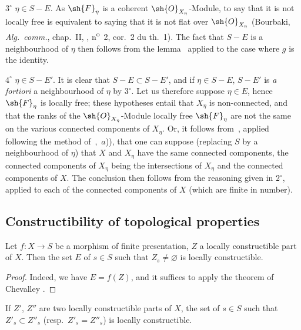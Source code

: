 $3^\circ$ $\eta\in S-E$.
As $\sh{F}_\eta$ is a coherent $\sh{O}_{X_\eta}$-Module, to say that it is not locally free is equivalent to saying that it is not flat over $\sh{O}_{X_\eta}$ (Bourbaki, \emph{Alg.\ comm.}, chap.~II, , n\textsuperscript{o}~2, cor.~2 du th.~1).
The fact that $S-E$ is a neighbourhood of $\eta$ then follows from the lemma~ applied to the case where $g$ is the identity.

$4^\circ$ $\eta\in S-E'$.
It is clear that $S-E\subset S-E'$, and if $\eta\in S-E$, $S-E'$ is \emph{a fortiori} a neighbourhood of $\eta$ by $3^\circ$.
Let us therefore suppose $\eta\in E$, hence $\sh{F}_\eta$ is locally free; these hypotheses entail that $X_\eta$ is non-connected, and that the ranks of the $\sh{O}_{X_\eta}$-Module locally free $\sh{F}_\eta$ are not the same on the various connected components of $X_\eta$.
Or, it follows from~, applied following the method of~,~$a$)), that one can suppose (replacing $S$ by a neighbourhood of $\eta$) that $X$ and $X_\eta$ have the same connected components, the connected components of $X_\eta$ being the intersections of $X_\eta$ and the connected components of $X$.
The conclusion then follows from the reasoning given in $2^\circ$, applied to each of the connected components of $X$ (which are finite in number).

\subsection{Constructibility of topological properties}
\label{subsection:IV.9.5}

\begin{proposition}[9.5.1]
\label{IV.9.5.1}
Let $f:X\to S$ be a morphism of finite presentation, $Z$ a locally constructible part of $X$.
Then the set $E$ of $s\in S$ such that $Z_s\neq\varnothing$ is locally constructible.
\end{proposition}

\begin{proof}
Indeed, we have $E=f(Z)$, and it suffices to apply the theorem of Chevalley .
\end{proof}

\begin{corollary}[9.5.2]
\label{IV.9.5.2}
If $Z'$, $Z''$ are two locally constructible parts of $X$, the set of $s\in S$ such that $Z'_s\subset Z''_s$ (resp.\ $Z'_s=Z''_s$) is locally constructible.
\end{corollary}

